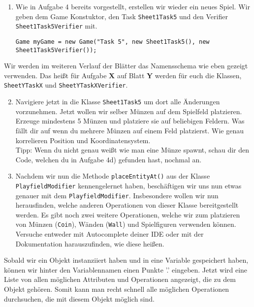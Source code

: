 

\begin{enumerate}
    \item Wie in Aufgabe 4 bereits vorgestellt, erstellen wir wieder ein neues Spiel. Wir geben dem Game Konstuktor, den Task \texttt{Sheet1Task5} und den Verifier \texttt{Sheet1Task5Verifier} mit.

    \begin{lstlisting}
Game myGame = new Game("Task 5", new Sheet1Task5(), new Sheet1Task5Verifier());
    \end{lstlisting}
\end{enumerate}

\begin{Infobox}
    Wir werden im weiteren Verlauf der Blätter das Namensschema wie eben gezeigt verwenden. Das heißt für Aufgabe \textbf{X} auf Blatt \textbf{Y} werden für euch die Klassen, \texttt{SheetYTaskX} und \texttt{SheetYTaskXVerifier}.
\end{Infobox}

\begin{enumerate} \setcounter{enumi}{1}
    \item Navigiere jetzt in die Klasse \texttt{Sheet1Task5} um dort alle Änderungen vorzunehmen. Jetzt wollen wir selber Münzen auf dem Spielfeld platzieren. Erzeuge mindestens 5 Münzen und platziere sie auf beliebigen Feldern. Was fällt dir auf wenn du mehrere Münzen auf einem Feld platzierst. Wie genau korrelieren Position und Koordinatensystem.\\
        Tipp: Wenn du nicht genau weißt wie man eine Münze spawnt, schau dir den Code, welchen du in Aufgabe 4d) gefunden hast, nochmal an.

    \item Nachdem wir nun die Methode \texttt{placeEntityAt()} aus der Klasse \texttt{PlayfieldModifier} kennengelernet haben, beschäftigen wir uns nun etwas genauer mit dem \texttt{PlayfieldModifier}. Insbesondere wollen wir nun herausfinden, welche anderen Operationen von dieser Klasse bereitgestellt werden. Es gibt noch zwei weitere Operationen, welche wir zum platzieren von Münzen (\texttt{Coin}), Wänden (\texttt{Wall}) und Spielfiguren verwenden können. Versuche entweder mit Autocomplete deiner IDE oder mit der Dokumentation harauszufinden, wie diese heißen.
\end{enumerate}

\begin{Infobox}[Autocompletion]
    Sobald wir ein Objekt instanziiert haben und in eine Variable gespeichert haben, können wir hinter den Variablennamen einen Punkte '.' eingeben. Jetzt wird eine Liste von allen möglichen Attributen und Operationen angezeigt, die zu dem Objekt gehören. Somit kann man recht schnell alle möglichen Operationen durchsuchen, die mit diesem Objekt möglich sind.
\end{Infobox}

